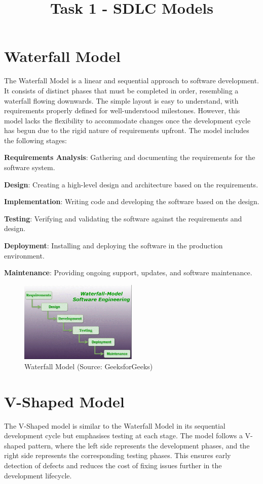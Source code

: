 \documentclass[12pt, a4paper]{article}
\title{Task 1 - SDLC Models}
\date{}
\begin{document}
\maketitle
\section{Waterfall Model}
The Waterfall Model is a linear and sequential approach to software development. It consists of distinct phases that must be completed in order, resembling a waterfall flowing downwards. The simple layout is easy to understand, with requirements properly defined for well-understood milestones. However, this model lacks the flexibility to accommodate changes once the development cycle has begun due to the rigid nature of requirements upfront.
The model includes the following stages:

\textbf{Requirements Analysis}: Gathering and documenting the requirements for the software system.

\textbf{Design}: Creating a high-level design and architecture based on the requirements.

\textbf{Implementation}: Writing code and developing the software based on the design.

\textbf{Testing}: Verifying and validating the software against the requirements and design.

\textbf{Deployment}: Installing and deploying the software in the production environment.

\textbf{Maintenance}: Providing ongoing support, updates, and software maintenance.

\begin{figure}[h]
    \centering
    \includegraphics[width=0.5\textwidth]{images/waterfall-model.png}
    \caption{Waterfall Model (Source: GeeksforGeeks)}
    \label{fig:waterfall}
\end{figure}

\section{V-Shaped Model}
The V-Shaped model is similar to the Waterfall Model in its sequential development cycle but emphasises testing at each stage. The model follows a V-shaped pattern, where the left side represents the development phases, and the right side represents the corresponding testing phases. This ensures early detection of defects and reduces the cost of fixing issues further in the development lifecycle.
\end{document}
